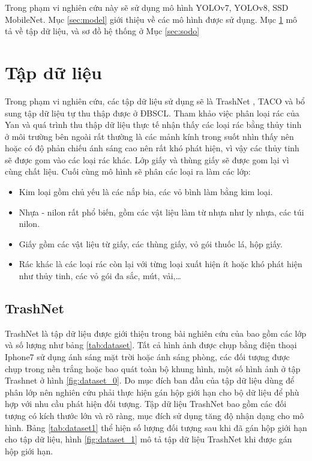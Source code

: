 \documentclass[../the.tex]{subfiles}
\begin{document}
{\fontsize{13}{12} \selectfont

Trong phạm vi nghiên cứu này sẽ sử dụng mô hình YOLOv7, YOLOv8, SSD MobileNet. Mục \ref{sec:model} giới thiệu về các mô hình được sử dụng. Mục \ref{sec:dataset} mô tả về tập dữ liệu, và sơ đồ hệ thống ở Mục \ref{sec:sodo}

}
\section{Tập dữ liệu}
\label{sec:dataset}

{\fontsize{13}{12} \selectfont

	Trong phạm vi nghiên cứu, các tập dữ liệu sử dụng sẽ là TrashNet \cite{yang2016classification}, TACO \cite{proença2020taco} và bổ sung tập dữ liệu tự thu thập được ở ĐBSCL.
	Tham khảo việc phân loại rác của Yan \cite{yang2016classification} và quá trình thu thập dữ liệu thực tế nhận thấy các loại rác bằng thủy tinh ở môi trường bên ngoài rất thường là các mảnh kính trong suốt nhìn thấy nên hoặc có độ phản chiếu ánh sáng cao nên rất khó phát hiện, vì vậy các thủy tinh sẽ được gom vào các loại rác khác.
	Lớp giấy và thùng giấy sẽ được gom lại vì cùng chất liệu. Cuối cùng mô hình sẽ phân các loại ra làm các lớp:
	\begin{itemize}
		\item Kim loại gồm chủ yếu là các nắp bia, các vỏ bình làm bằng kim loại.
		\item Nhựa - nilon rất phổ biến, gồm các vật liệu làm từ nhựa như ly nhựa, các túi nilon.
		\item Giấy gồm các vật liệu từ giấy, các thùng giấy, vỏ gói thuốc lá, hộp giấy.
		\item Rác khác là các loại rác còn lại với từng loại xuất hiện ít hoặc khó phát hiện như thủy tinh, các vỏ gói đa sắc,
		      mút, vải,\dots
	\end{itemize}
}

\subsection{TrashNet}
\label{sec:trashnet}
{\fontsize{13}{12} \selectfont

	TrashNet là tập dữ liệu được giới thiệu trong bài nghiên cứu của \cite{yang2016classification} bao gồm các lớp và số lượng như bảng \ref{tab:dataset}. Tất cả hình ảnh được chụp bằng điện thoại Iphone7 sử dụng ánh sáng mặt trời hoặc ánh sáng phòng, các đối tượng được chụp trong nền trắng hoặc bao quát toàn bộ khung hình, một số hình ảnh ở tập Trashnet ở hình
	\ref{fig:dataset_0}.
	Do mục đích ban đầu của tập dữ liệu dùng để phân lớp nên nghiên cứu phải thực hiện gán hộp giới hạn cho bộ dữ liệu để phù hợp với nhu cầu phát hiện đối tượng. Tập dữ liệu TrashNet bao gồm các đối tượng có kích thước lớn và rõ ràng, mục đích sử dụng tăng độ nhận dạng cho mô hình. Bảng \ref{tab:dataset1} thể hiện số lượng đối tượng sau khi đã gán hộp giới hạn cho tập dữ liệu, hình
	\ref{fig:dataset_1} mô tả tập dữ liệu TrashNet khi được gán hộp giới hạn.

}
\end{document}
